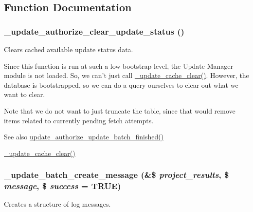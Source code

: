 \subsection{Function Documentation}
\hypertarget{update_8authorize_8inc_a040122d69ea274f33e081405f8f522ee}{
\subsubsection[{\_\-update\_\-authorize\_\-clear\_\-update\_\-status}]{\setlength{\rightskip}{0pt plus 5cm}\_\-update\_\-authorize\_\-clear\_\-update\_\-status ()}}
\label{update_8authorize_8inc_a040122d69ea274f33e081405f8f522ee}
Clears cached available update status data.

Since this function is run at such a low bootstrap level, the Update Manager module is not loaded. So, we can't just call \hyperlink{group__update__status__cache_ga45fc31b5f9949fc0081ed148a9f378dd}{\_\-update\_\-cache\_\-clear()}. However, the database is bootstrapped, so we can do a query ourselves to clear out what we want to clear.

Note that we do not want to just truncate the table, since that would remove items related to currently pending fetch attempts.

\begin{DoxySeeAlso}{See also}
\hyperlink{update_8authorize_8inc_af57a6cf83861d59b3aa904b3d68c1f73}{update\_\-authorize\_\-update\_\-batch\_\-finished()} 

\hyperlink{group__update__status__cache_ga45fc31b5f9949fc0081ed148a9f378dd}{\_\-update\_\-cache\_\-clear()} 
\end{DoxySeeAlso}
\hypertarget{update_8authorize_8inc_a52e1e0077fe627d777ce1089da0c6b9d}{
\subsubsection[{\_\-update\_\-batch\_\-create\_\-message}]{\setlength{\rightskip}{0pt plus 5cm}\_\-update\_\-batch\_\-create\_\-message (\&\$ {\em project\_\-results}, \/  \$ {\em message}, \/  \$ {\em success} = {\ttfamily TRUE})}}
\label{update_8authorize_8inc_a52e1e0077fe627d777ce1089da0c6b9d}
Creates a structure of log messages.


